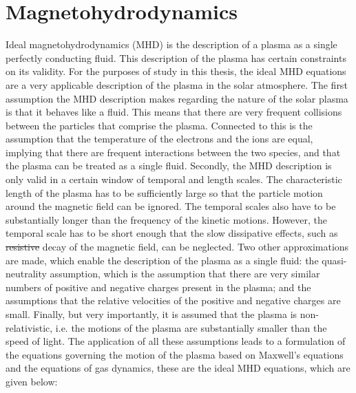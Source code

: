 \documentclass[a4paper,12pt,fourier,authoryear,custommargin]{Classes/PhDThesisPSnPDF}
\renewcommand{\vec}{\mathbf}
\providecommand{\DIFaddtex}[1]{{\protect\color{blue}\uwave{#1}}} %
\providecommand{\DIFdeltex}[1]{{\protect\color{red}\sout{#1}}}                      %
\providecommand{\DIFaddbegin}{} %
\providecommand{\DIFaddend}{} %
\providecommand{\DIFdelbegin}{} %
\providecommand{\DIFdelend}{} %
\providecommand{\DIFadd}[1]{\texorpdfstring{\DIFaddtex{#1}}{#1}} %
\providecommand{\DIFdel}[1]{\texorpdfstring{\DIFdeltex{#1}}{}} %
\begin{document}
\section{Magnetohydrodynamics}\label{sec:MHD}

Ideal magnetohydrodynamics (MHD) is the description of a plasma as a single perfectly conducting fluid.
This description of the plasma has certain constraints on its validity.
For the purposes of study in this thesis, the ideal MHD equations are a very applicable description of the plasma in the solar atmosphere.
The first assumption the MHD description makes regarding the nature of the solar plasma is that it behaves like a fluid.
This means that there are very frequent collisions between the particles that comprise the plasma.
Connected to this is the assumption that the temperature of the electrons and the ions are equal, implying that there are frequent interactions between the two species, and that the plasma can be treated as a single fluid.
Secondly, the MHD description is only valid in a certain window of temporal and length scales.
The characteristic length of the plasma has to be sufficiently large so that the particle motion around the magnetic field can be ignored.
The temporal scales also have to be substantially longer than the frequency of the kinetic motions.
However, the temporal scale has to be short enough that the slow dissipative effects, such as \DIFdelbegin \DIFdel{resistive }\DIFdelend \DIFaddbegin \DIFadd{restive }\DIFaddend decay of the magnetic field, can be neglected.
Two other approximations are made, which enable the description of the plasma as a single fluid: the quasi-neutrality assumption, which is the assumption that there are very similar numbers of positive and negative charges present in the plasma; and the assumptions that the relative velocities of the positive and negative charges are small.
Finally, but very importantly, it is assumed that the plasma is non-relativistic, i.e. the motions of the plasma are substantially smaller than the speed of light.
The application of all these assumptions leads to a formulation of the equations governing the motion of the plasma based on Maxwell's equations and the equations of gas dynamics, these are the ideal MHD equations, which are given below:
\newcommand{\condev}{\left(\frac{\partial}{\partial t} + \vec{v}\cdot\nabla\right)}
\end{document}

